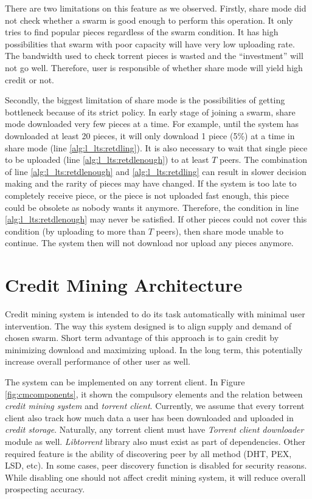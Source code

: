 There are two limitations on this feature as we observed. Firstly, share mode did not check whether a swarm is good enough to perform this operation. It only tries to find popular pieces regardless of the swarm condition. It has high possibilities that swarm with poor capacity will have very low uploading rate. The bandwidth used to check torrent pieces is wasted and the ``investment'' will not go well. Therefore, user is responsible of whether share mode will yield high credit or not.

Secondly, the biggest limitation of share mode is the possibilities of getting bottleneck because of its strict policy. In early stage of joining a swarm, share mode downloaded very few pieces at a time. For example, until the system has downloaded at least 20 pieces, it will only download 1 piece (5\%) at a time in share mode (line \ref{alg:l_lts:retdling}). It is also necessary to wait that single piece to be uploaded (line \ref{alg:l_lts:retdlenough}) to at least $T$ peers. The combination of line \ref{alg:l_lts:retdlenough} and \ref{alg:l_lts:retdling} can result in slower decision making and the rarity of pieces may have changed. If the system is too late to completely receive piece, or the piece is not uploaded fast enough, this piece could be obsolete as nobody wants it anymore. Therefore, the condition in line \ref{alg:l_lts:retdlenough} may never be satisfied. If other pieces could not cover this condition (by uploading to more than $T$ peers), then share mode unable to continue. The system then will not download nor upload any pieces anymore.

\section{Credit Mining Architecture}
\label{section:cmcomponents}

Credit mining system is intended to do its task automatically with minimal user intervention. The way this system designed is to align supply and demand of chosen swarm. Short term advantage of this approach is to gain credit by minimizing download and maximizing upload. In the long term, this potentially increase overall performance of other user as well.

The system can be implemented on any torrent client. In Figure \ref{fig:cmcomponents}, it shown the compulsory elements and the relation between \textit{credit mining system} and \textit{torrent client}. Currently, we assume that every torrent client also track how much data a user has been downloaded and uploaded in \textit{credit storage}. Naturally, any torrent client must have \textit{Torrent client downloader} module as well. \textit{Libtorrent} library also must exist as part of dependencies. Other required feature is the ability of discovering peer by all method (DHT, PEX, LSD, etc). In some cases, peer discovery function is disabled for security reasons. While disabling one should not affect credit mining system, it will reduce overall prospecting accuracy.

